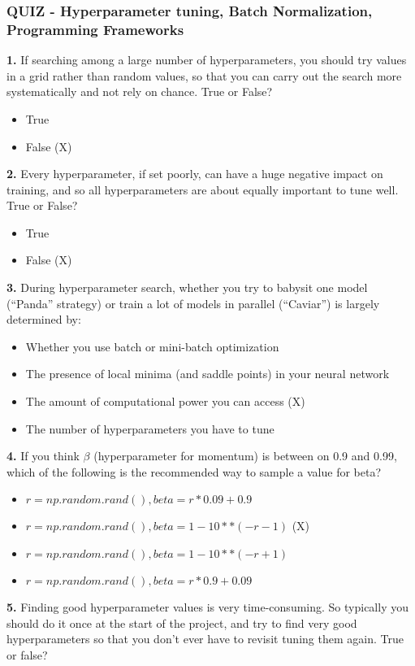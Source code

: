 \subsubsection*{QUIZ - Hyperparameter tuning, Batch Normalization, Programming Frameworks}
\textbf{1.} If searching among a large number of hyperparameters, you should try values in a grid rather than random values, so that you can carry out the search more systematically and not rely on chance. True or False?
\begin{itemize}
    \item True
    \item False (X)
\end{itemize}
\textbf{2.} Every hyperparameter, if set poorly, can have a huge negative impact on training, and so all hyperparameters are about equally important to tune well. True or False?
\begin{itemize}
    \item True
    \item False (X)
\end{itemize}
\textbf{3.} During hyperparameter search, whether you try to babysit one model (“Panda” strategy) or train a lot of models in parallel (“Caviar”) is largely determined by:
\begin{itemize}
    \item Whether you use batch or mini-batch optimization
    \item The presence of local minima (and saddle points) in your neural network
    \item The amount of computational power you can access (X)
    \item The number of hyperparameters you have to tune
\end{itemize}
\textbf{4.} If you think $\beta$ (hyperparameter for momentum) is between on 0.9 and 0.99, which of the following is the recommended way to sample a value for beta?
\begin{itemize}
    \item $r = np.random.rand(), beta = r*0.09 + 0.9 $
    \item $r = np.random.rand(), beta = 1-10**(- r - 1)$ (X)
    \item $r = np.random.rand(), beta = 1-10**(- r + 1)$
    \item $r = np.random.rand(), beta = r*0.9 + 0.09 $
\end{itemize}
\textbf{5.} Finding good hyperparameter values is very time-consuming. So typically you should do it once at the start of the project, and try to find very good hyperparameters so that you don’t ever have to revisit tuning them again. True or false?

